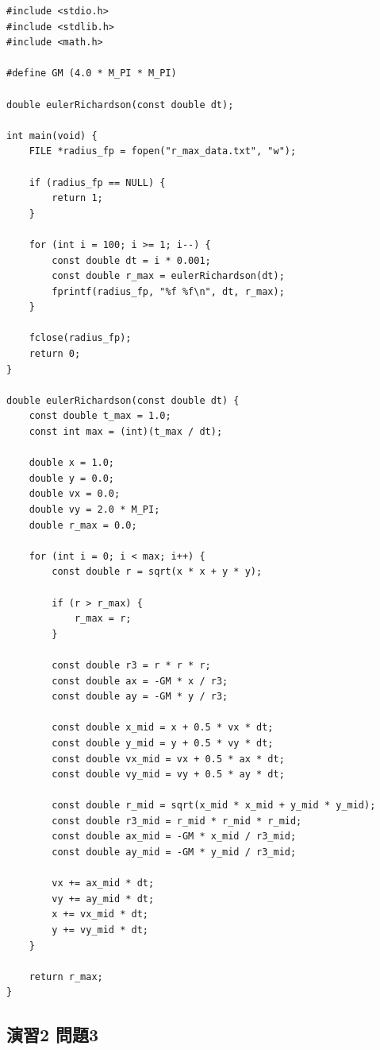 \documentclass[uplatex,dvipdfmx]{jsarticle}
\begin{document}
\begin{lstlisting}
#include <stdio.h>
#include <stdlib.h>
#include <math.h>

#define GM (4.0 * M_PI * M_PI)

double eulerRichardson(const double dt);

int main(void) {
	FILE *radius_fp = fopen("r_max_data.txt", "w");

	if (radius_fp == NULL) {
		return 1;
	}

	for (int i = 100; i >= 1; i--) {
		const double dt = i * 0.001;
		const double r_max = eulerRichardson(dt);
		fprintf(radius_fp, "%f %f\n", dt, r_max);
	}

	fclose(radius_fp);
	return 0;
}

double eulerRichardson(const double dt) {
	const double t_max = 1.0;
	const int max = (int)(t_max / dt);

	double x = 1.0;
	double y = 0.0;
	double vx = 0.0;
	double vy = 2.0 * M_PI;
	double r_max = 0.0;

	for (int i = 0; i < max; i++) {
		const double r = sqrt(x * x + y * y);

		if (r > r_max) {
			r_max = r;
		}

		const double r3 = r * r * r;
		const double ax = -GM * x / r3;
		const double ay = -GM * y / r3;

		const double x_mid = x + 0.5 * vx * dt;
		const double y_mid = y + 0.5 * vy * dt;
		const double vx_mid = vx + 0.5 * ax * dt;
		const double vy_mid = vy + 0.5 * ay * dt;

		const double r_mid = sqrt(x_mid * x_mid + y_mid * y_mid);
		const double r3_mid = r_mid * r_mid * r_mid;
		const double ax_mid = -GM * x_mid / r3_mid;
		const double ay_mid = -GM * y_mid / r3_mid;

		vx += ax_mid * dt;
		vy += ay_mid * dt;
		x += vx_mid * dt;
		y += vy_mid * dt;
	}

	return r_max;
}
\end{lstlisting}


\subsection{演習2 問題3}
\end{document}
